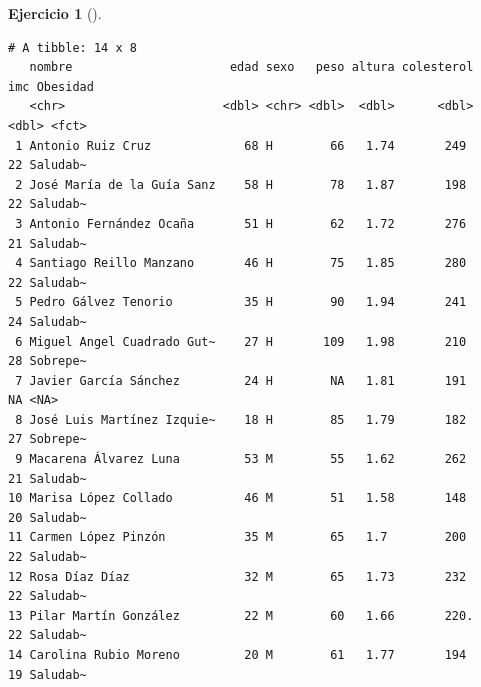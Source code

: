 \documentclass[
  a4paper,
]{scrreport}
\theoremstyle{definition}
\newtheorem{exercise}{Ejercicio}[chapter]
\theoremstyle{remark}
\begin{document}
\begin{exercise}[]
\begin{enumerate}
\begin{tcolorbox}
\begin{verbatim}
# A tibble: 14 x 8
   nombre                      edad sexo   peso altura colesterol   imc Obesidad
   <chr>                      <dbl> <chr> <dbl>  <dbl>      <dbl> <dbl> <fct>   
 1 Antonio Ruiz Cruz             68 H        66   1.74       249     22 Saludab~
 2 José María de la Guía Sanz    58 H        78   1.87       198     22 Saludab~
 3 Antonio Fernández Ocaña       51 H        62   1.72       276     21 Saludab~
 4 Santiago Reillo Manzano       46 H        75   1.85       280     22 Saludab~
 5 Pedro Gálvez Tenorio          35 H        90   1.94       241     24 Saludab~
 6 Miguel Angel Cuadrado Gut~    27 H       109   1.98       210     28 Sobrepe~
 7 Javier García Sánchez         24 H        NA   1.81       191     NA <NA>    
 8 José Luis Martínez Izquie~    18 H        85   1.79       182     27 Sobrepe~
 9 Macarena Álvarez Luna         53 M        55   1.62       262     21 Saludab~
10 Marisa López Collado          46 M        51   1.58       148     20 Saludab~
11 Carmen López Pinzón           35 M        65   1.7        200     22 Saludab~
12 Rosa Díaz Díaz                32 M        65   1.73       232     22 Saludab~
13 Pilar Martín González         22 M        60   1.66       220.    22 Saludab~
14 Carolina Rubio Moreno         20 M        61   1.77       194     19 Saludab~
\end{verbatim}

  \end{tcolorbox}
\end{enumerate}

\end{exercise}
\end{document}
